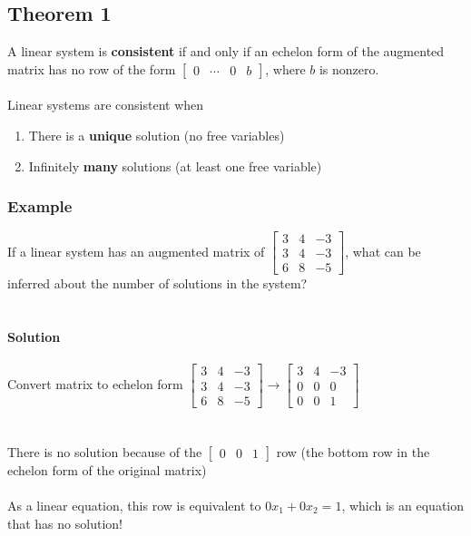 \subsection{Theorem 1}
A linear system is \textbf{consistent} if and only if an echelon form of
the augmented matrix has no row of the form $\left[\begin{array}{ccc|c} 0 
& \cdots & 0 & b \end{array}\right]$, where $b$ is nonzero. \\\\
Linear systems are consistent when
\begin{enumerate}
  \item There is a \textbf{unique} solution (no free variables)
  \item Infinitely \textbf{many} solutions (at least one free variable)
\end{enumerate}
\subsubsection{Example}
If a linear system has an augmented matrix of
$\left[\begin{array}{cc|c}
  3 & 4 & -3 \\
  3 & 4 & -3 \\
  6 & 8 & -5
\end{array}\right]$, what can be inferred about the number of solutions in the
system? \\\\\\
\textbf{Solution} \\\\
Convert matrix to echelon form
$\left[\begin{array}{cc|c}
  3 & 4 & -3 \\
  3 & 4 & -3 \\
  6 & 8 & -5
\end{array}\right] \rightarrow
\left[\begin{array}{cc|c}
  3 & 4 & -3 \\
  0 & 0 & 0 \\
  0 & 0 & 1
\end{array}\right]$ \\\\\\
There is no solution because of the $\left[\begin{array}{cc|c}
  0 & 0 & 1
\end{array}\right]$ row (the bottom row in the echelon form of
the original matrix) \\\\
As a linear equation, this row is equivalent to $0x_1 + 0x_2 = 1$, 
which is an equation that has no solution!

